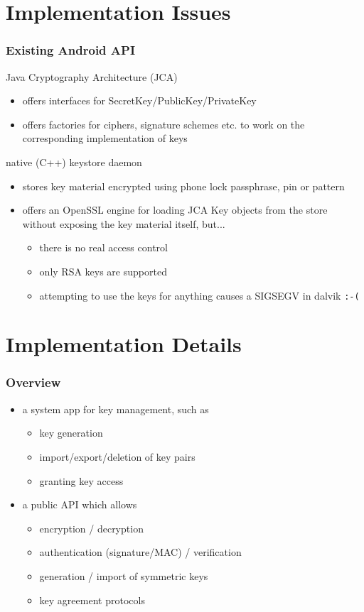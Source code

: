 \documentclass{beamer}
\begin{document}
\section{Implementation Issues}
	\begin{frame}
		\tableofcontents[currentsection]
	\end{frame}
	\begin{frame}
		\frametitle{Existing Android API}

		Java Cryptography Architecture (JCA)
		\begin{itemize}
			\item offers interfaces for SecretKey/PublicKey/PrivateKey
			\item offers factories for ciphers, signature schemes etc. to work on the corresponding implementation of keys
		\end{itemize}

		native (C++) keystore daemon
		\begin{itemize}
			\item stores key material encrypted using phone lock passphrase, pin or pattern
			\item offers an OpenSSL engine for loading JCA Key objects from the store without exposing the key material itself, but...
				\begin{itemize}
					\item there is no real access control
					\item only RSA keys are supported
					\item attempting to use the keys for anything causes a SIGSEGV in dalvik {\tt :-(}
				\end{itemize}
		\end{itemize}
	\end{frame}
\section{Implementation Details}
	\begin{frame}
		\tableofcontents[currentsection]
	\end{frame}
	\begin{frame}
		\frametitle{Overview}
		\begin{itemize}
			\item a system app for key management, such as
				\begin{itemize}
					\item key generation
					\item import/export/deletion of key pairs
					\item granting key access
				\end{itemize}
			\item a public API which allows
				\begin{itemize}
					\item encryption / decryption
					\item authentication (signature/MAC) / verification
					\item generation / import of symmetric keys
					\item key agreement protocols
				\end{itemize}
		\end{itemize}
	\end{frame}
\end{document}
